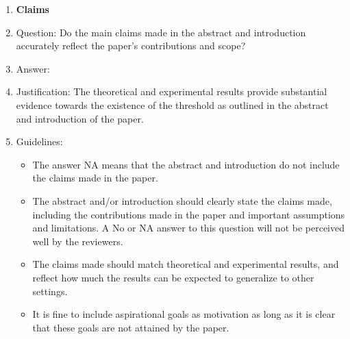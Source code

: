 \documentclass{article}
\theoremstyle{plain}
\theoremstyle{definition}
\theoremstyle{remark}
\begin{document}
 



\begin{enumerate}

\item {\bf Claims}
    \item[] Question: Do the main claims made in the abstract and introduction accurately reflect the paper's contributions and scope?
    \item[] Answer: \answerYes{} %
    \item[] Justification: The theoretical and experimental results provide substantial evidence towards the existence of the threshold as outlined in the abstract and introduction of the paper.
    \item[] Guidelines:
    \begin{itemize}
        \item The answer NA means that the abstract and introduction do not include the claims made in the paper.
        \item The abstract and/or introduction should clearly state the claims made, including the contributions made in the paper and important assumptions and limitations. A No or NA answer to this question will not be perceived well by the reviewers. 
        \item The claims made should match theoretical and experimental results, and reflect how much the results can be expected to generalize to other settings. 
        \item It is fine to include aspirational goals as motivation as long as it is clear that these goals are not attained by the paper. 
    \end{itemize}


\end{enumerate}
\end{document}
